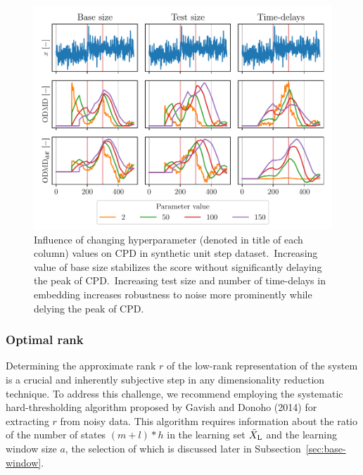 \begin{figure}[H]
    \centering
    \includegraphics[width=\linewidth]{figures/Unit step-parameters-influence-ref_size_test_size_hn.pdf}
    \caption{Influence of changing hyperparameter (denoted in title of each column) values on CPD in synthetic unit step dataset.~Increasing value of base size stabilizes the score without significantly delaying the peak of CPD.~Increasing test size and number of time-delays in embedding increases robustness to noise more prominently while delying the peak of CPD.}\label{fig:hyperparameters}
\end{figure}

\subsubsection{Optimal rank}
Determining the approximate rank \( r \) of the low-rank representation of the system is a crucial and inherently subjective step in any dimensionality reduction technique. To address this challenge, we recommend employing the systematic hard-thresholding algorithm proposed by Gavish and Donoho (2014) for extracting \( r \) from noisy data. This algorithm requires information about the ratio of the number of states \((m + l) * h\) in the learning set \(\bar{X} _{\text{L}}\) and the learning window size \(a\), the selection of which is discussed later in Subsection~\ref{sec:base-window}.

